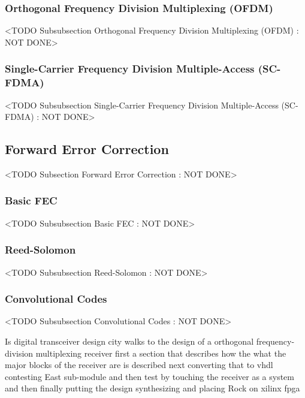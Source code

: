\subsubsection{Orthogonal Frequency Division Multiplexing (OFDM)}
	<TODO Subsubsection  Orthogonal Frequency Division Multiplexing (OFDM) : NOT DONE>

\subsubsection{Single-Carrier Frequency Division Multiple-Access (SC-FDMA)}
	<TODO Subsubsection  Single-Carrier Frequency Division Multiple-Access (SC-FDMA) : NOT DONE>

\subsection{Forward Error Correction}
	<TODO Subsection Forward Error Correction : NOT DONE>

\subsubsection{Basic FEC}
	<TODO Subsubsection  Basic FEC : NOT DONE>

\subsubsection{Reed-Solomon}
	<TODO Subsubsection  Reed-Solomon : NOT DONE>

\subsubsection{Convolutional Codes}
	<TODO Subsubsection  Convolutional Codes : NOT DONE>

Is digital transceiver design city walks to the design of a orthogonal frequency-division multiplexing receiver first a section that describes how the what the major blocks of the receiver are is described next converting that to vhdl contesting East sub-module and then test by touching the receiver as a system and then finally putting the design synthesizing and placing Rock on xilinx fpga

